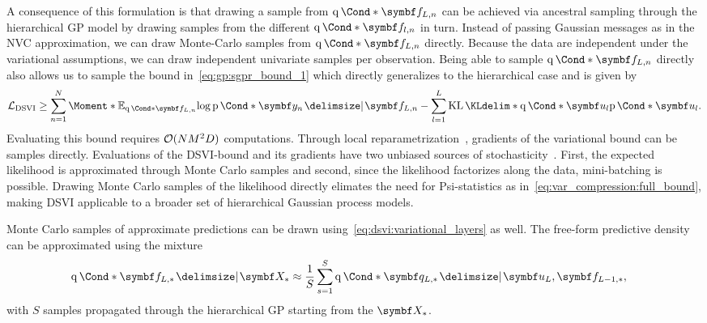A consequence of this formulation is that drawing a sample from $\Variat*{\mat{f}_{L,n}}$ can be achieved via ancestral sampling through the hierarchical GP model by drawing samples from the different $\Variat*{\mat{f}_{l, n}}$ in turn.
Instead of passing Gaussian messages as in the NVC approximation, we can draw Monte-Carlo samples from $\Variat*{\mat{f}_{L, n}}$ directly.
Because the data are independent under the variational assumptions, we can draw independent univariate samples per observation.
Being able to sample $\Variat*{\mat{f}_{L, n}}$ directly also allows us to sample the bound in~\cref{eq:gp:sgpr_bound_1} which directly generalizes to the hierarchical case and is given by
\begin{align}
    \begin{split}
        \label{eq:dsvi:full_bound}
        \Lc_{\text{DSVI}} \geq
        \sum_{n=1}^N \Moment*{\E_{\Variat*{\mat{f}_{L, n}}}}{\log \Prob*{\mat{y}_n \given \mat{f}_{L, n}}}
        - \sum_{l=1}^L \KL*{\Variat*{\mat{u}_l}}{\Prob*{\mat{u}_l}}.
    \end{split}
\end{align}
Evaluating this bound requires $\operatorname{\mathcal{O}}(NM^2D)$ computations.
Through local reparametrization~\parencite{kingma_variational_2015}, gradients of the variational bound can be samples directly.
Evaluations of the DSVI-bound and its gradients have two unbiased sources of stochasticity~\parencite{salimbeni_doubly_2017}.
First, the expected likelihood is approximated through Monte Carlo samples and second, since the likelihood factorizes along the data, mini-batching is possible.
Drawing Monte Carlo samples of the likelihood directly elimates the need for Psi-statistics as in~\cref{eq:var_compression:full_bound}, making DSVI applicable to a broader set of hierarchical Gaussian process models.

Monte Carlo samples of approximate predictions can be drawn using~\cref{eq:dsvi:variational_layers} as well.
The free-form predictive density can be approximated using the mixture
\begin{align}
    \begin{split}
        \label{eq:dsvi:approximate_predictions}
        \Variat*{\mat{f}_{L, \ast} \given \mat{X}_{\ast}}
        &\approx \frac{1}{S} \sum_{s=1}^S \Variat*{\mat{q}_{L, \ast} \given \mat{u}_L, \mat{f}_{L-1, \ast}},
    \end{split}
\end{align}
with $S$ samples propagated through the hierarchical GP starting from the $\mat{X}_{\ast}$.
